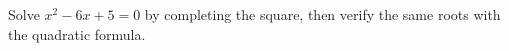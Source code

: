 Solve $x^2-6x+5=0$ by completing the square, then verify the same roots with the quadratic formula.
